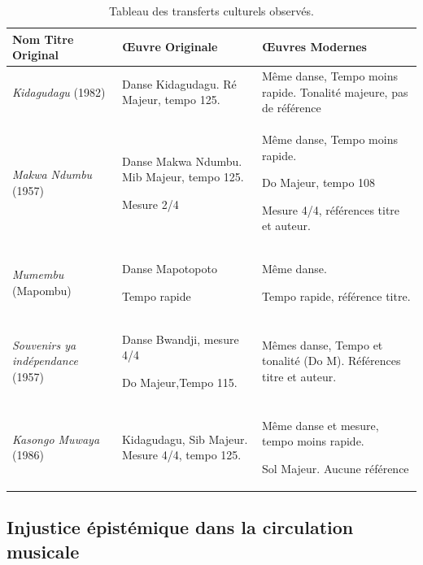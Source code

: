\documentclass[final,fra]{anthology-ch}         %
\begin{document}
\begin{table}[htp]
    \centering\small
    \begin{tabular}{p{}p{}p{}}
    \toprule
    Nom Titre Original
     & Œuvre Originale
     & Œuvres Modernes
     \\
    \midrule
    \emph{Kidagudagu} (1982) & Danse Kidagudagu.
    Ré Majeur, tempo 125. & Même danse, Tempo moins rapide.
    Tonalité majeure, pas de référence \\
    \emph{Makwa Ndumbu} (1957) & Danse Makwa Ndumbu.
    Mib Majeur, tempo 125.
    
    Mesure 2/4 & Même danse, Tempo moins rapide.
    
    Do Majeur, tempo 108
    
    Mesure 4/4, références titre et auteur.
    \\
    \emph{Mumembu} (Mapombu) & Danse Mapotopoto
    
    Tempo rapide & Même danse.
    
    Tempo rapide, référence titre.
    \\
    \emph{Souvenirs ya indépendance} (1957) & Danse Bwandji, mesure 4/4
    
    Do Majeur,Tempo 115. & Mêmes danse, Tempo et tonalité (Do M).
    Références titre et auteur. \\
    \emph{Kasongo Muwaya} (1986) & Kidagudagu, Sib Majeur.
    Mesure 4/4, tempo 125. & Même danse et mesure, tempo moins rapide.
    
    Sol Majeur.
    Aucune référence \\
    \bottomrule
    \end{tabular}
    \caption{Tableau des transferts culturels observés.}
    \label{tab:tab1}
    \vspace{-.3cm}
\end{table}

\subsection{Injustice épistémique dans la circulation musicale}
\end{document}
